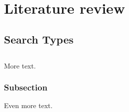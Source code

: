 \chapter{Literature review\label{cha:litreivew}}

\cite{Li2013a}

\section{Search Types}
\section{}


More text.

\subsection{Subsection}

Even more text.
